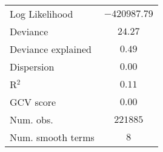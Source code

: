 \begin{longtable}{l c}
Log Likelihood                   & $-420987.79$   \\
Deviance                         & $24.27$        \\
Deviance explained               & $0.49$         \\
Dispersion                       & $0.00$         \\
R$^2$                            & $0.11$         \\
GCV score                        & $0.00$         \\
Num. obs.                        & $221885$       \\
Num. smooth terms                & $8$            \\
\end{longtable}
